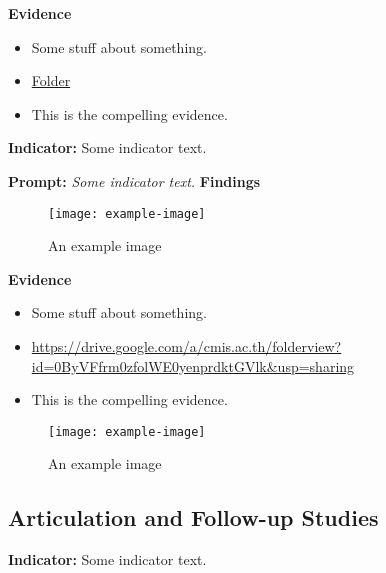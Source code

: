 \documentclass{report}
\begin{document}
\noindent\textbf{Evidence}
\vspace{-\topsep}

\begin{itemize}[leftmargin=*]
\setlength{\parskip}{0pt}
\setlength{\itemsep}{0pt plus 1pt}
\item Some stuff about something.
\item \href{https://drive.google.com/a/cmis.ac.th/folderview?id=0ByVFfrm0zfolWE0yenprdktGVlk&usp=sharing}{Folder}
\item This is the compelling evidence.
\end{itemize}

\noindent\textbf{Indicator:} Some indicator text.

\noindent\textbf{Prompt:} \textit{Some indicator text.}
\noindent\textbf{Findings}

\blindtext

\blinditemize[6]

\blindtext

\begin{figure}[h!]
\caption[An example image]{An example image}
\centering
\texttt{[image: example-image]}
\end{figure}


\noindent\textbf{Evidence}
\vspace{-\topsep}

\begin{itemize}[leftmargin=*]
\setlength{\parskip}{0pt}
\setlength{\itemsep}{0pt plus 1pt}
\item Some stuff about something.
\item \url{https://drive.google.com/a/cmis.ac.th/folderview?id=0ByVFfrm0zfolWE0yenprdktGVlk&usp=sharing}
\item This is the compelling evidence.
\end{itemize}

\begin{figure}[h!]
\caption[An example image]{An example image}
\centering
\texttt{[image: example-image]}
\end{figure}


\subsection{Articulation and Follow-up Studies}
\blindtext

\blindtext
 
\noindent\textbf{Indicator:} Some indicator text.
\end{document}
